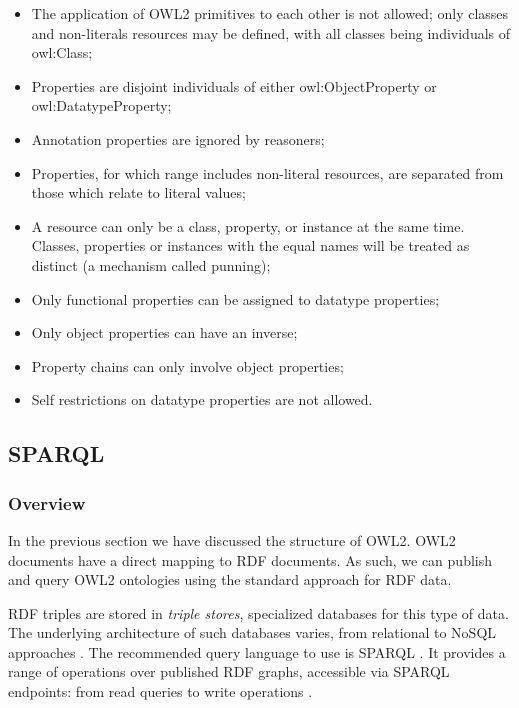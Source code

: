 \begin{itemize}
    \item The application of \gls{OWL2} primitives to each other is not allowed; only classes and non-literals resources may be defined, with all classes being individuals of owl:Class;
    \item Properties are disjoint individuals of either owl:ObjectProperty or owl:DatatypeProperty;
    \item Annotation properties are ignored by reasoners;
    \item Properties, for which range includes non-literal resources, are separated from those which relate to literal values; 
    \item A resource can only be a class, property, or instance at the same time. Classes, properties or instances with the equal names will be treated as distinct (a mechanism called punning);
    \item Only functional properties can be assigned to datatype properties;
    \item Only object properties can have an inverse;
    \item Property chains can only involve object properties;
    \item Self restrictions on datatype properties are not allowed.
\end{itemize}

\subsection{SPARQL}
\label{ch2:sec:semantic-web:sparql}

\subsubsection{Overview}

In the previous section we have discussed the structure of \gls{OWL2}. \gls{OWL2} documents have a direct mapping to \gls{RDF} documents. As such, we can publish and query \gls{OWL2} ontologies using the standard approach for \gls{RDF} data. 

\gls{RDF} triples are stored in \emph{triple stores}, specialized databases for this type of data. The underlying architecture of such databases varies, from relational to NoSQL approaches \autocite{Cure2014-vm, Modoni2014-cz}. The recommended query language to use is \gls{SPARQL} \autocite{W3c2013-hd}. It provides a range of operations over published \gls{RDF} graphs, accessible via SPARQL endpoints: from read queries \autocite{W3c2008-vf} to write operations \autocite{W3c_undated-tw, W3c2013-rr}. 

